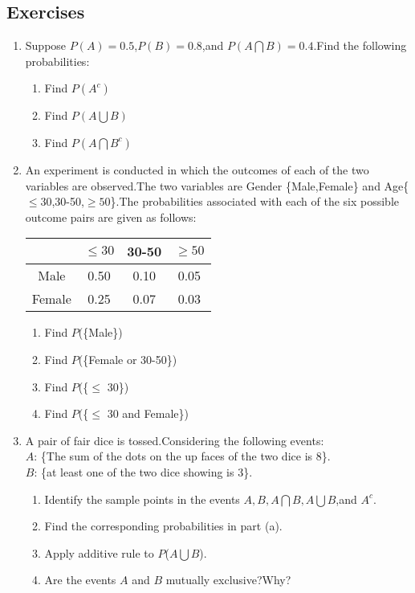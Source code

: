




\subsection{Exercises}
\begin{enumerate}
\item Suppose $P(A)=0.5$,$P(B)=0.8$,and $P(A\bigcap B)=0.4$.Find the following probabilities:
\begin{enumerate}
\item Find $P(A^{c})$ 
\item Find $P(A\bigcup B)$
\item Find $P(A\bigcap B^{c})$
\end{enumerate}

\item An experiment is conducted in which the outcomes of each of the two variables are observed.The two variables are Gender \{Male,Female\} and Age\{$\leq 30$,30-50,$\geq50$\}.The probabilities associated with each of the six possible outcome pairs are given as follows:
\begin{center}
\begin{tabular}{|c|c|c|c|}\hline
             &$\leq 30$&30-50&$\geq50$\\ \hline   
Male         &0.50     &0.10 &0.05\\ \hline
Female       &0.25     &0.07 &0.03\\ \hline
\end{tabular}
\end{center}
\begin{enumerate}
\item Find $P$(\{Male\})
\item Find $P$(\{Female or 30-50\})
\item Find $P$(\{$\leq$ 30\})
\item Find $P$(\{$\leq$ 30 and Female\})
\end{enumerate}


\item A pair of fair dice is tossed.Considering the following events:\\
$A$: \{The sum of the dots on the up faces of the two dice is 8\}.\\
$B$: \{at least one of the two dice showing is 3\}.


\begin{enumerate}
\item Identify the sample points in the events $A,B,A\bigcap B,A\bigcup B$,and $A^{c}$.
\item Find the corresponding probabilities in part (a). 
\item Apply additive rule to $P$($A \bigcup B$).
\item Are the events $A$ and $B$ mutually exclusive?Why?
\end{enumerate}




\end{enumerate}
